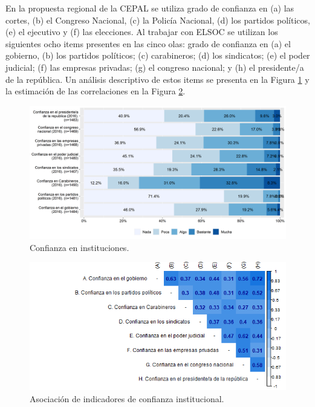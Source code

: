 \documentclass[
  12pt,
]{book}
\begin{document}
En la propuesta regional de la CEPAL se utiliza grado de confianza en (a) las cortes, (b) el Congreso Nacional, (c) la Policía Nacional, (d) los partidos políticos, (e) el ejecutivo y (f) las elecciones. Al trabajar con ELSOC se utilizan los siguientes ocho items presentes en las cinco olas: grado de confianza en (a) el gobierno, (b) los partidos políticos; (c) carabineros; (d) los sindicatos; (e) el poder judicial; (f) las empresas privadas; (g) el congreso nacional; y (h) el presidente/a de la república. Un análisis descriptivo de estos items se presenta en la Figura \ref{fig:confianza-institucional} y la estimación de las correlaciones en la Figura \ref{fig:confianza-institucional-cor}.

\begin{figure}[H]

{\centering \includegraphics[width=1\linewidth,height=1\textheight]{output/graphs/confianza-institucional} 

}

\caption{Confianza en instituciones.}\label{fig:confianza-institucional}
\end{figure}

\begin{figure}[H]

{\centering \includegraphics[width=1\linewidth,height=1\textheight]{output/graphs/confianza-institucional_cor} 

}

\caption{Asociación de indicadores de confianza institucional.}\label{fig:confianza-institucional-cor}
\end{figure}
\end{document}
